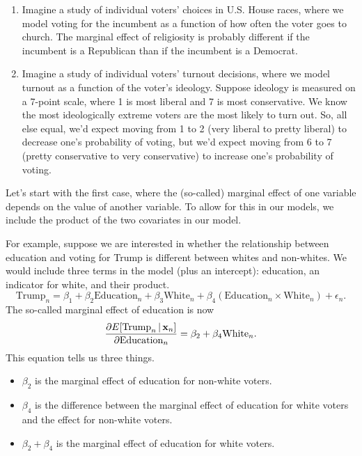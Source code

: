 \documentclass[12pt,oneside,openany]{book}
\begin{document}
\begin{enumerate}
\def\labelenumi{\arabic{enumi}.}
\item
  Imagine a study of individual voters' choices in U.S. House races,
  where we model voting for the incumbent as a function of how often the
  voter goes to church. The marginal effect of religiosity is probably
  different if the incumbent is a Republican than if the incumbent is a
  Democrat.
\item
  Imagine a study of individual voters' turnout decisions, where we
  model turnout as a function of the voter's ideology. Suppose ideology
  is measured on a 7-point scale, where 1 is most liberal and 7 is most
  conservative. We know the most ideologically extreme voters are the
  most likely to turn out. So, all else equal, we'd expect moving from 1
  to 2 (very liberal to pretty liberal) to decrease one's probability of
  voting, but we'd expect moving from 6 to 7 (pretty conservative to
  very conservative) to increase one's probability of voting.
\end{enumerate}

Let's start with the first case, where the (so-called) marginal effect
of one variable depends on the value of another variable. To allow for
this in our models, we include the product of the two covariates in our
model.

For example, suppose we are interested in whether the relationship
between education and voting for Trump is different between whites and
non-whites. We would include three terms in the model (plus an
intercept): education, an indicator for white, and their product. \[
\text{Trump}_n = \beta_1 + \beta_2 \text{Education}_n + \beta_3 \text{White}_n + \beta_4 (\text{Education}_n \times \text{White}_n) + \epsilon_n.
\] The so-called marginal effect of education is now \[
\frac{\partial{}E[\text{Trump}_n \,|\, \mathbf{x}_n]}{\partial{}\text{Education}_n}
= \beta_2 + \beta_4 \text{White}_n.
\] This equation tells us three things.

\begin{itemize}
\item
  \(\beta_2\) is the marginal effect of education for non-white voters.
\item
  \(\beta_4\) is the difference between the marginal effect of education
  for white voters and the effect for non-white voters.
\item
  \(\beta_2 + \beta_4\) is the marginal effect of education for white
  voters.
\end{itemize}
\end{document}
